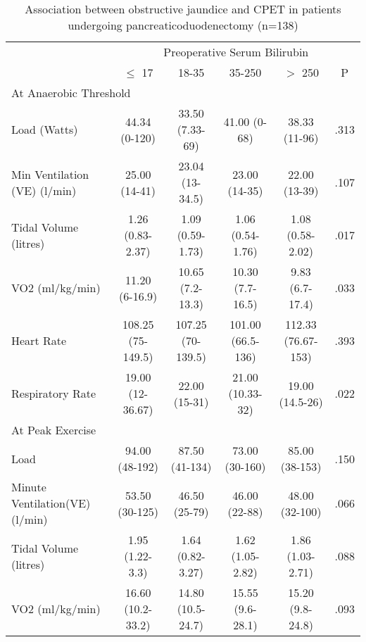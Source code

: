 \begin{sidewaystable}[p]
	\caption{Association between obstructive jaundice and CPET in patients undergoing pancreaticoduodenectomy (n=138)  }
	\label{table:cpet_oj_table4}
	\centering
	\renewcommand{\arraystretch}{1.2} %
	
	\begin{tabular}{l c c c c c}
		                               &                   \multicolumn{5}{c}{Preoperative Serum Bilirubin}                    \\
		                               & $\leq$ 17         & 18-35             & 35-250            & $>$ 250            & P    \\ \hline
		\multicolumn{6}{l}{At Anaerobic Threshold}                                                                             \\
		Load  (Watts)                  & 44.34 (0-120)     & 33.50 (7.33-69)   & 41.00 (0-68)      & 38.33 (11-96)      & .313 \\
		Min Ventilation (VE) (l/min)   & 25.00 (14-41)     & 23.04 (13-34.5)   & 23.00 (14-35)     & 22.00 (13-39)      & .107 \\
		Tidal Volume (litres)          & 1.26 (0.83-2.37)  & 1.09 (0.59-1.73)  & 1.06 (0.54-1.76)  & 1.08 (0.58-2.02)   & .017 \\
		VO2 (ml/kg/min)                & 11.20 (6-16.9)    & 10.65 (7.2-13.3)  & 10.30 (7.7-16.5)  & 9.83 (6.7-17.4)    & .033 \\
		Heart Rate                     & 108.25 (75-149.5) & 107.25 (70-139.5) & 101.00 (66.5-136) & 112.33 (76.67-153) & .393 \\
		Respiratory Rate               & 19.00 (12-36.67)  & 22.00 (15-31)     & 21.00 (10.33-32)  & 19.00 (14.5-26)    & .022 \\
		\multicolumn{6}{l}{At Peak Exercise}                                                                                   \\
		Load                           & 94.00 (48-192)    & 87.50 (41-134)    & 73.00 (30-160)    & 85.00 (38-153)     & .150 \\
		Minute Ventilation(VE) (l/min) & 53.50 (30-125)    & 46.50 (25-79)     & 46.00 (22-88)     & 48.00 (32-100)     & .066 \\
		Tidal Volume (litres)          & 1.95 (1.22-3.3)   & 1.64 (0.82-3.27)  & 1.62 (1.05-2.82)  & 1.86 (1.03-2.71)   & .088 \\
		VO2 (ml/kg/min)                & 16.60 (10.2-33.2) & 14.80 (10.5-24.7) & 15.55 (9.6-28.1)  & 15.20 (9.8-24.8)   & .093 \\ \hline
	\end{tabular}
\end{sidewaystable}
